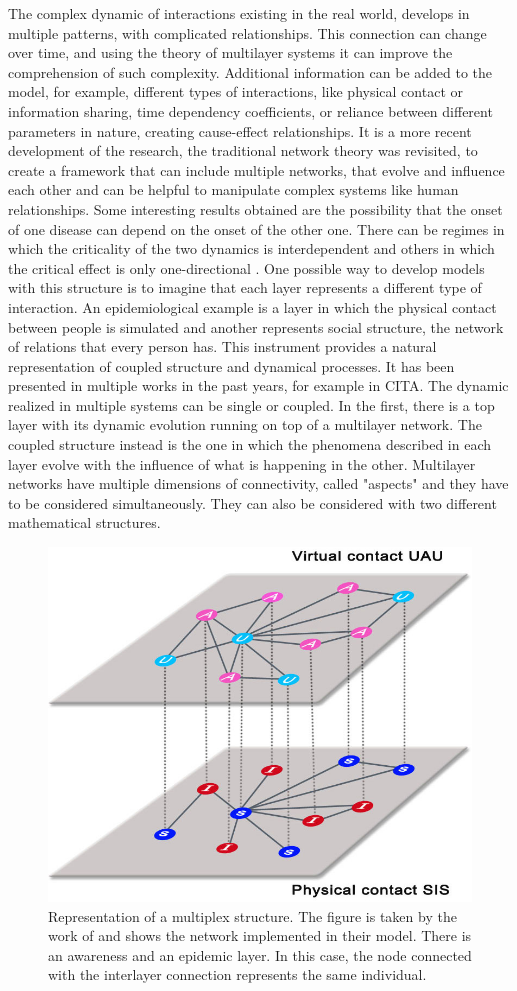 The complex dynamic of interactions existing in the real world, develops in multiple patterns, with complicated relationships. This connection can change over time, and using the theory of multilayer systems it can improve the comprehension of such complexity. Additional information can be added to the model, for example, different types of interactions, like physical contact or information sharing, time dependency coefficients, or reliance between different parameters in nature, creating cause-effect relationships. 
It is a more recent development of the research, the traditional network theory was revisited, to create a framework that can include multiple networks, that evolve and influence each other \cite{DeDomenico2016} and can be helpful to manipulate complex systems like human relationships. Some interesting results obtained are the possibility that the onset of one disease can depend on the onset of the other one. There can be regimes in which the criticality of the two dynamics is interdependent and others in which the critical effect is only one-directional \cite{DeDomenico2016}. 
One possible way to develop models with this structure is to imagine that each layer represents a different type of interaction. An epidemiological example is a layer in which the physical contact between people is simulated and another represents social structure, the network of relations that every person has. This instrument provides a natural representation of coupled structure and dynamical processes. It has been presented in multiple works in the past years, for example in CITA. 
The dynamic realized in multiple systems can be single or coupled. In the first, there is a top layer with its dynamic evolution running on top of a multilayer network. The coupled structure instead is the one in which the phenomena described in each layer evolve with the influence of what is happening in the other. 
Multilayer networks have multiple dimensions of connectivity, called "aspects" and they have to be considered simultaneously. 
They can also be considered with two different mathematical structures. 
\begin{figure}[]
	\centering
	\includegraphics[width=0.6\linewidth]{0_introduction/images_introduction/multi_layer}
	\caption[Multi-layer network]{Representation of a multiplex structure. The figure is taken by the work of \cite{Granell2013} and shows the network implemented in their model. There is an awareness and an epidemic layer. In this case, the node connected with the interlayer connection represents the same individual.}
	\label{fig:multilayer}
\end{figure}

